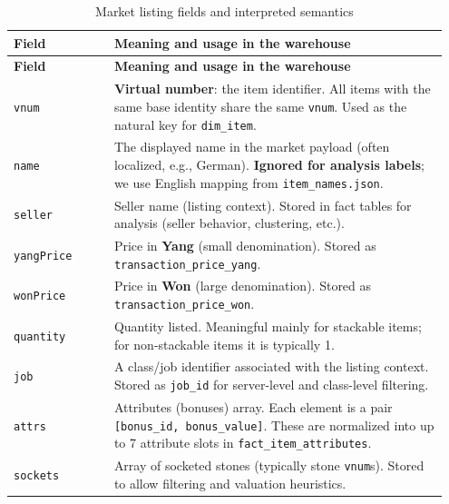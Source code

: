 \begin{longtable}{@{}p{0.22\linewidth}p{0.73\linewidth}@{}}
\caption{Market listing fields and interpreted semantics}\label{tab:market-payload-fields}\\
		\toprule
		\textbf{Field} & \textbf{Meaning and usage in the warehouse} \\
\midrule
\endfirsthead
		\toprule
		\textbf{Field} & \textbf{Meaning and usage in the warehouse} \\
\midrule
\endhead
\bottomrule
\endfoot

	\texttt{vnum} & \textbf{Virtual number}: the item identifier. All items with the same base identity share the same \texttt{vnum}. Used as the natural key for \texttt{dim\_item}. \\

	\texttt{name} & The displayed name in the market payload (often localized, e.g., German). \textbf{Ignored for analysis labels}; we use English mapping from \texttt{item\_names.json}. \\

	\texttt{seller} & Seller name (listing context). Stored in fact tables for analysis (seller behavior, clustering, etc.). \\

	\texttt{yangPrice} & Price in \textbf{Yang} (small denomination). Stored as \texttt{transaction\_price\_yang}. \\

	\texttt{wonPrice} & Price in \textbf{Won} (large denomination). Stored as \texttt{transaction\_price\_won}. \\

	\texttt{quantity} & Quantity listed. Meaningful mainly for stackable items; for non-stackable items it is typically 1. \\

	\texttt{job} & A class/job identifier associated with the listing context. Stored as \texttt{job\_id} for server-level and class-level filtering. \\

	\texttt{attrs} & Attributes (bonuses) array. Each element is a pair \texttt{[bonus\_id, bonus\_value]}. These are normalized into up to 7 attribute slots in \texttt{fact\_item\_attributes}. \\

	\texttt{sockets} & Array of socketed stones (typically stone \texttt{vnum}s). Stored to allow filtering and valuation heuristics. \\


\end{longtable}
